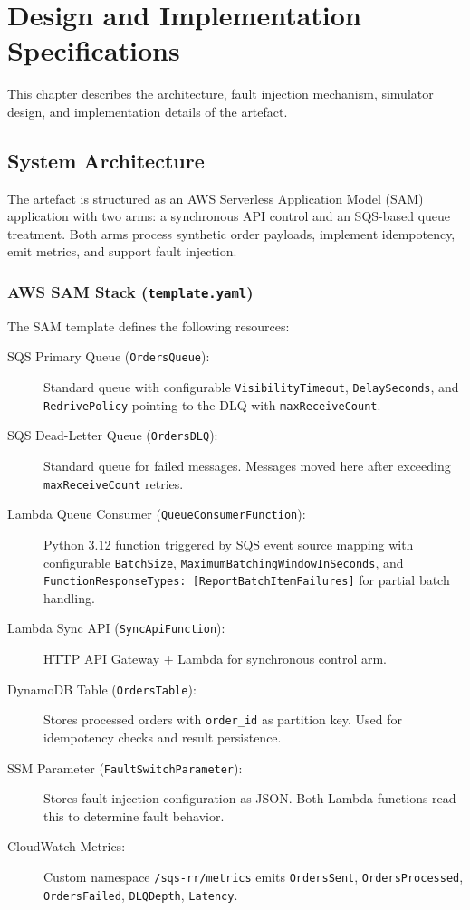 \chapter{Design and Implementation Specifications}

This chapter describes the architecture, fault injection mechanism, simulator design, and implementation details of the artefact.

\section{System Architecture}

The artefact is structured as an AWS Serverless Application Model (SAM) application with two arms: a synchronous API control and an SQS-based queue treatment. Both arms process synthetic order payloads, implement idempotency, emit metrics, and support fault injection.

\subsection{AWS SAM Stack (\texttt{template.yaml})}

The SAM template defines the following resources:

\begin{description}
    \item[SQS Primary Queue (\texttt{OrdersQueue}):] Standard queue with configurable \texttt{VisibilityTimeout}, \texttt{DelaySeconds}, and \texttt{RedrivePolicy} pointing to the DLQ with \texttt{maxReceiveCount}.
    
    \item[SQS Dead-Letter Queue (\texttt{OrdersDLQ}):] Standard queue for failed messages. Messages moved here after exceeding \texttt{maxReceiveCount} retries.
    
    \item[Lambda Queue Consumer (\texttt{QueueConsumerFunction}):] Python 3.12 function triggered by SQS event source mapping with configurable \texttt{BatchSize}, \texttt{MaximumBatchingWindowInSeconds}, and \texttt{FunctionResponseTypes: [ReportBatchItemFailures]} for partial batch handling.
    
    \item[Lambda Sync API (\texttt{SyncApiFunction}):] HTTP API Gateway + Lambda for synchronous control arm.
    
    \item[DynamoDB Table (\texttt{OrdersTable}):] Stores processed orders with \texttt{order\_id} as partition key. Used for idempotency checks and result persistence.
    
    \item[SSM Parameter (\texttt{FaultSwitchParameter}):] Stores fault injection configuration as JSON. Both Lambda functions read this to determine fault behavior.
    
    \item[CloudWatch Metrics:] Custom namespace \texttt{/sqs-rr/metrics} emits \texttt{OrdersSent}, \texttt{OrdersProcessed}, \texttt{OrdersFailed}, \texttt{DLQDepth}, \texttt{Latency}.
\end{description}

